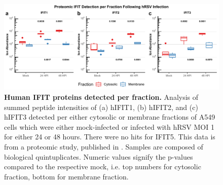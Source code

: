 \begin{figure}
    \centering
    \includegraphics[width=1\linewidth]{06. Chapter 1/Figs/01. Induction/13. merged_proteomics.pdf}
    \caption[Human IFIT proteins detected per fraction.]{\textbf{Human IFIT proteins detected per fraction.} Analysis of summed peptide intensities of (a) hIFIT1, (b) hIFIT2, and (c) hIFIT3 detected per either cytosolic or membrane fractions of A549 cells which were either mock-infected or infected with hRSV MOI 1 for either 24 or 48 hours. There were no hits for IFIT5. This data is from a proteomic study, published in \cite{Jobe2023ViralCondensates}. Samples are composed of biological quintuplicates. Numeric values signify the p-values compared to the respective mock, i.e. top numbers for cytosolic fraction, bottom for membrane fraction.}
    \label{Human IFIT proteomics.}
\end{figure}

